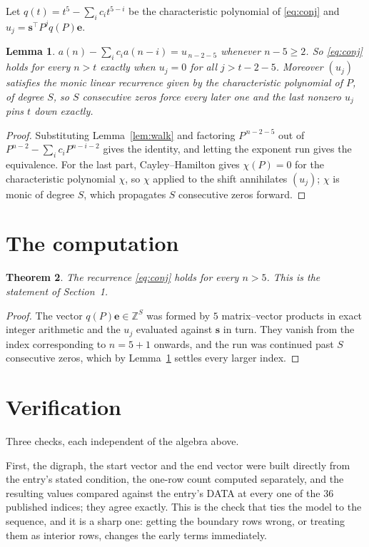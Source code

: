 \documentclass[11pt,a4paper]{article}
\theoremstyle{plain}
\newtheorem{theorem}{Theorem}
\newtheorem{lemma}[theorem]{Lemma}
\theoremstyle{definition}
\begin{document}
Let $q(t)=t^{5}-\sum_i c_i t^{5-i}$ be the characteristic polynomial of
\eqref{eq:conj} and $u_j=\mathbf{s}^{\!\top}P^{j}q(P)\mathbf{e}$.

\begin{lemma}\label{lem:crit}
$a(n)-\sum_i c_i a(n-i)=u_{\,n-2-5}$ whenever $n-5\ge2$. So \eqref{eq:conj}
holds for every $n>t$ exactly when $u_j=0$ for all $j>t-2-5$. Moreover $(u_j)$
satisfies the monic linear recurrence given by the characteristic polynomial of $P$, of
degree $S$, so $S$ consecutive zeros force every later one and the last nonzero $u_j$ pins
$t$ down exactly.
\end{lemma}

\begin{proof}
Substituting Lemma~\ref{lem:walk} and factoring $P^{\,n-2-5}$ out of
$P^{n-2}-\sum_i c_i P^{n-i-2}$ gives the identity, and letting the exponent run gives the
equivalence. For the last part, Cayley--Hamilton gives $\chi(P)=0$ for the characteristic
polynomial $\chi$, so $\chi$ applied to the shift annihilates $(u_j)$; $\chi$ is monic of
degree $S$, which propagates $S$ consecutive zeros forward.
\end{proof}

\section{The computation}

\begin{theorem}
The recurrence \eqref{eq:conj} holds for every $n>5$. This is the statement of
Section~1.
\end{theorem}

\begin{proof}
The vector $q(P)\mathbf{e}\in\mathbb{Z}^{S}$ was formed by $5$ matrix--vector
products in exact integer arithmetic and the $u_j$ evaluated against $\mathbf{s}$ in turn.
They vanish from the index corresponding to $n=5+1$ onwards, and the run was continued
past $S$ consecutive zeros, which by Lemma~\ref{lem:crit} settles every larger index.
\end{proof}

\section{Verification}

Three checks, each independent of the algebra above.

First, the digraph, the start vector and the end vector were built directly from the
entry's stated condition, the one-row count computed separately, and the resulting values
compared against the entry's DATA at every one of the $36$ published indices; they
agree exactly. This is the check that ties the model to the sequence, and it is a sharp one:
getting the boundary rows wrong, or treating them as interior rows, changes the early terms
immediately.
\end{document}
